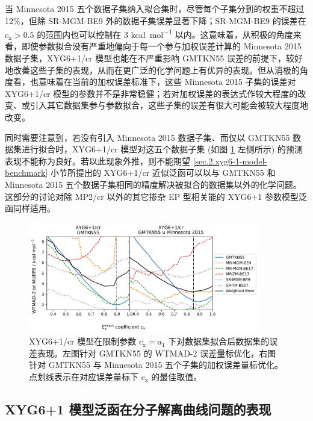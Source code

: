 当 Minnesota 2015 五个数据子集纳入拟合集时，尽管每个子集分到的权重不超过 12\%，但除 SR-MGM-BE9 外的数据子集误差显著下降；SR-MGM-BE9 的误差在 $c_\mathrm{x} > 0.5$ 的范围内也可以控制在 3 \si{kcal.mol^{-1}} 以内。这意味着，从积极的角度来看，即使参数拟合没有严重地偏向于每一个参与加权误差计算的 Minnesota 2015 数据子集，XYG6+1/cr 模型也能在不严重影响 GMTKN55 误差的前提下，较好地改善这些子集的表现，从而在更广泛的化学问题上有优异的表现。但从消极的角度看，也意味着在当前的加权误差标准下，这些 Minnesota 2015 子集的误差对 XYG6+1/cr 模型的参数并不是非常稳健；若对加权误差的表达式作较大程度的改变、或引入其它数据集参与参数拟合，这些子集的误差有很大可能会被较大程度地改变。

同时需要注意到，若没有引入 Minnesota 2015 数据子集、而仅以 GMTKN55 数据集进行拟合时，XYG6+1/cr 模型对这五个数据子集 (如图 \ref{fig.2.plot-seq-xyg7} 左侧所示) 的预测表现不能称为良好。若以此现象外推，则不能期望 \ref{sec.2.xyg6-1-model-benchmark} 小节所提出的 XYG6+1/cr 近似泛函可以以与 GMTKN55 和 Minnesota 2015 五个数据子集相同的精度解决被拟合的数据集以外的化学问题。这部分的讨论对除 MP2/cr 以外的其它掺杂 EP 型相关能的 XYG6+1 参数模型泛函同样适用。

\begin{figure}[h]
  \centering
  \includegraphics[width=0.9\textwidth]{assets/plot-seq-cr.pdf}
  \caption[XYG6+1/cr 模型在限制 $E_\mathrm{x}^\textmt{exact}$ 系数下不同参数优化策略测评误差]{XYG6+1/cr 模型在限制参数 $c_\mathrm{x} = a_1$ 下对数据集拟合后数据集的误差表现。左图针对 GMTKN55 的 WTMAD-2 误差量标优化，右图针对 GMTKN55 与 Minnesota 2015 五个子集的加权误差量标优化。点划线表示在对应误差量标下 $c_\mathrm{x}$ 的最佳取值。}
  \label{fig.2.plot-seq-xyg7}
\end{figure}

\subsection{XYG6+1 模型泛函在分子解离曲线问题的表现}

